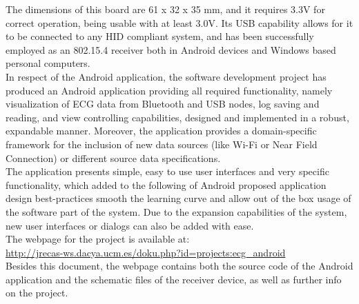 		The dimensions of this board are 61 x 32 x 35 mm, and it requires 3.3V for correct operation, being usable with at least 3.0V. Its USB capability allows for it to be connected to any HID compliant system, and has been successfully employed as an 802.15.4 receiver both in Android devices and Windows based personal computers.\\

		In respect of the Android application, the software development project has produced an Android application providing all required functionality, namely visualization of ECG data from Bluetooth and USB nodes, log saving and reading, and view controlling capabilities, designed and implemented in a robust, expandable manner. Moreover, the application provides a domain-specific framework for the inclusion of new data sources (like Wi-Fi or Near Field Connection) or different source data specifications.\\

		The application presents simple, easy to use user interfaces and very specific functionality, which added to the following of Android proposed application design best-practices smooth the learning curve and allow out of the box usage of the software part of the system. Due to the expansion capabilities of the system, new user interfaces or dialogs can also be added with ease.\\

		The webpage for the project is available at:\\

		\url{http://jrecas-ws.dacya.ucm.es/doku.php?id=projects:ecg_android}\\

		Besides this document, the webpage contains both the source code of the Android application and the schematic files of the receiver device, as well as further info on the project.
	

